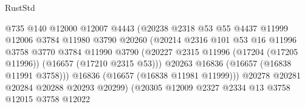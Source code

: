 \begin{lexlean}{RustStd}
\begin{coremodule}
                                        @735
                                        @140
                                        @12000
                                        @12007
                                        @4443
                                        (@20238
                                          @2318
                                          @53
                                          @55
                                          @4437
                                          @11999
                                          @12006
                                          @3784
                                          @11980
                                          @3790
                                          @20260
                                          (@20214
                                            @2316
                                            @101
                                            @53
                                            @16
                                            @11996
                                            @3758
                                            @3770
                                            @3784
                                            @11990
                                            @3790
                                            (@20227
                                              @2315
                                              @11996
                                              (@17204 (@17205 @11996))
                                              (@16657 (@17210 @2315 @53)))
                                            @20263
                                            @16836
                                            (@16657 (@16838 @11991 @3758)))
                                          @16836
                                          (@16657 (@16838 @11981 @11999)))
                                        @20278
                                        @20281
                                        @20284
                                        @20288
                                        @20293
                                        @20299)
                                      (@20305
                                        @12009
                                        @2327
                                        @2334
                                        @13
                                        @3758
                                        @12015
                                        @3758
                                        @12022

\end{coremodule}
\end{lexlean}
